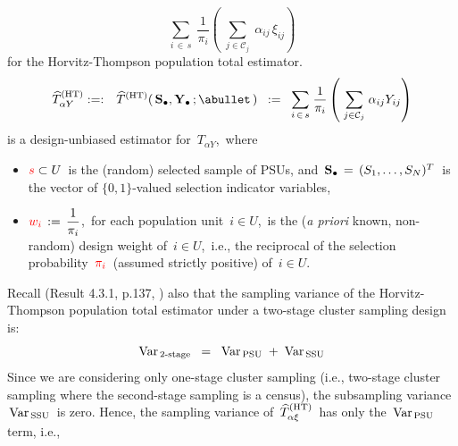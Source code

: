 \begin{itemize}
{{\begin{equation*}
            \underset{i\,\in\,s}{\sum}\;
                \dfrac{1}{\pi_{i}}\!
                \left(\;
                    \underset{j \in \mathcal{C}_{j}}{\sum}\;\alpha_{ij}\,\xi_{ij}
                    \right)
        \end{equation*}
        for the Horvitz-Thompson population total estimator.
        }
    }
    \begin{eqnarray*}
    \widehat{T}^{\textnormal{(HT)}}_{\alpha Y}
    & :=: &
        \widehat{T}^{\textnormal{(HT)}}(\,\Sdot,\Ydot\,;\abullet\,)
    \;\; := \;\;
        \underset{i\,\in\,s}{\sum}\;
            \dfrac{1}{\pi_{i}}
            \left(\;
                \underset{j \in \mathcal{C}_{j}}{\sum}\;
                \alpha_{ij}Y_{ij}
                \right)
    \end{eqnarray*}
    is a design-unbiased estimator for
    \,$T_{\alpha Y}$,\,
    where
    \begin{itemize}
    \item
        ${\color{red}s} \subset U$\, is the (random) selected sample of PSUs, and
        \,$\mathbf{S}_{\bullet} \,=\, (S_{1},\ldots,S_{N})^{T}$\,
        is the vector of $\{0,1\}$-valued selection indicator variables,
    \item
        ${\color{red}w_{i}} \,:=\, \dfrac{1}{\pi_{i}}$,\, for each population unit \,$i \in U$,\,
        is the (\textit{a priori} known, non-random) design weight of \,$i \in U$,\,
        i.e., the reciprocal of the selection probability \,${\color{red}\pi_{i}}$\,
        (assumed strictly positive) of \,$i \in U$.\,
    \end{itemize}
    Recall (Result 4.3.1, p.137, \cite{Sarndal1992}) also that
    the sampling variance of the Horvitz-Thompson population total estimator
    under a two-stage cluster sampling design is:
    \begin{equation*}
    \textnormal{Var}_{\,\textnormal{2-stage}}
    \;\; = \;\;
        \textnormal{Var}_{\,\textnormal{PSU}}
        \; + \;
        \textnormal{Var}_{\,\textnormal{SSU}}
    \end{equation*}
    Since we are considering only one-stage cluster sampling
    (i.e., two-stage cluster sampling where the second-stage sampling is a census),
    the subsampling variance \,$\textnormal{Var}_{\,\textnormal{SSU}}$\, is zero.
    Hence, the sampling variance of
    \,$
    \widehat{T}^{\textnormal{(HT)}}_{\alpha\xi}
    $\,
    has only the \,$\textnormal{Var}_{\,\textnormal{PSU}}$\, term, i.e.,

\end{itemize}
